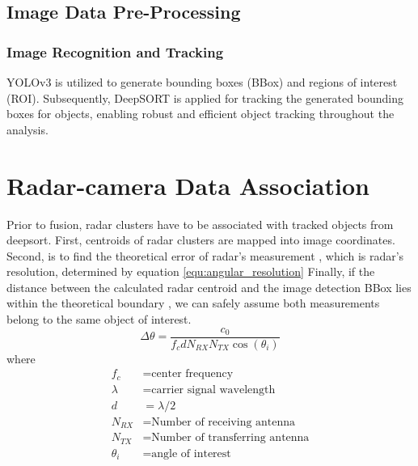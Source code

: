 \subsection{Image Data Pre-Processing}\label{sec:2-img_recognition}
\subsubsection{Image Recognition and Tracking}
YOLOv3 is utilized to generate bounding boxes (BBox) and regions of interest (ROI)\cite{redmon2018yolov3}.
Subsequently, DeepSORT is applied for tracking the generated bounding boxes for objects, 
enabling robust and efficient object tracking throughout the analysis\cite{Wojke2017simple}.

\section{Radar-camera Data Association}\label{sec:2-association}
Prior to fusion, radar clusters have to be associated with tracked objects from deepsort.
First, centroids of radar clusters are mapped into image coordinates.
Second, is to find the theoretical error of radar's measurement \cite{8844649}, which is radar's resolution, determined by equation \ref*{equ:angular_resolution}
Finally, if the distance between the calculated radar centroid and the image detection BBox lies within the theoretical boundary
, we can safely assume both measurements belong to the same object of interest.
\begin{equation}\label{equ:angular_resolution}
    \Delta \theta= \frac{c_0}{f_c d N_{RX} N_{TX} \cos(\theta _i)}
\end{equation}
where
\begin{align*}
    f_c & = \text{center frequency} \\
    \lambda & = \text{carrier signal wavelength} \\
    d & =  \lambda/2 \\
    N_{RX} & = \text{Number of receiving antenna}\\
    N_{TX}& = \text{Number of transferring antenna}\\
    \theta _i &= \text{angle of interest}
\end{align*}

